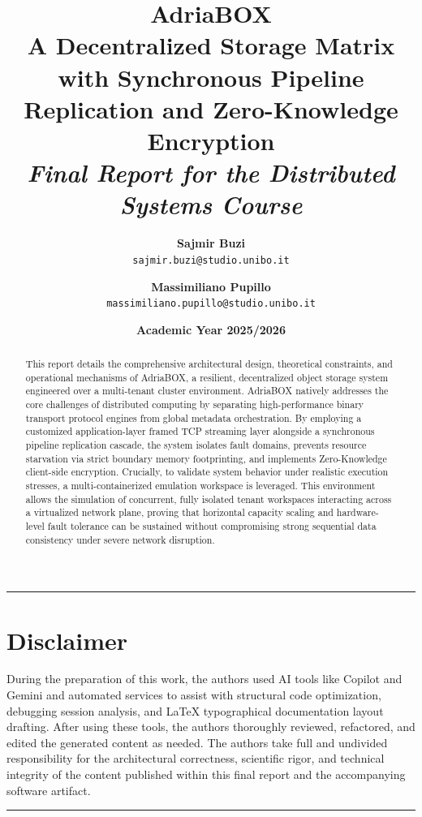\documentclass[11pt,a4paper]{article}
\title{
    \vspace{-2cm}
    \textbf{\huge AdriaBOX}\\
    \vspace{0.5cm}
    \large A Decentralized Storage Matrix with Synchronous Pipeline Replication and Zero-Knowledge Encryption\\
    \vspace{0.3cm}
    \large\textit{Final Report for the Distributed Systems Course}
}
\author{
    \textbf{Sajmir Buzi} \\
    \texttt{sajmir.buzi@studio.unibo.it}
    \and
    \textbf{Massimiliano Pupillo} \\
    \texttt{massimiliano.pupillo@studio.unibo.it}
}
\date{\textbf{Academic Year 2025/2026}}
\begin{document}
\maketitle

\begin{abstract}
This report details the comprehensive architectural design, theoretical constraints, and operational mechanisms of AdriaBOX, a resilient, decentralized object storage system engineered over a multi-tenant cluster environment. AdriaBOX natively addresses the core challenges of distributed computing by separating high-performance binary transport protocol engines from global metadata orchestration. By employing a customized application-layer framed TCP streaming layer alongside a synchronous pipeline replication cascade, the system isolates fault domains, prevents resource starvation via strict boundary memory footprinting, and implements Zero-Knowledge client-side encryption. Crucially, to validate system behavior under realistic execution stresses, a multi-containerized emulation workspace is leveraged. This environment allows the simulation of concurrent, fully isolated tenant workspaces interacting across a virtualized network plane, proving that horizontal capacity scaling and hardware-level fault tolerance can be sustained without compromising strong sequential data consistency under severe network disruption.
\end{abstract}

\vspace{1cm}
\noindent\rule{\textwidth}{0.5pt}
\section*{Disclaimer}
During the preparation of this work, the authors used AI tools like Copilot and Gemini and automated services to assist with structural code optimization, debugging session analysis, and LaTeX typographical documentation layout drafting. After using these tools, the authors thoroughly reviewed, refactored, and edited the generated content as needed. The authors take full and undivided responsibility for the architectural correctness, scientific rigor, and technical integrity of the content published within this final report and the accompanying software artifact.
\noindent\rule{\textwidth}{0.5pt}

\clearpage

\tableofcontents
\clearpage











\appendix



\end{document}
